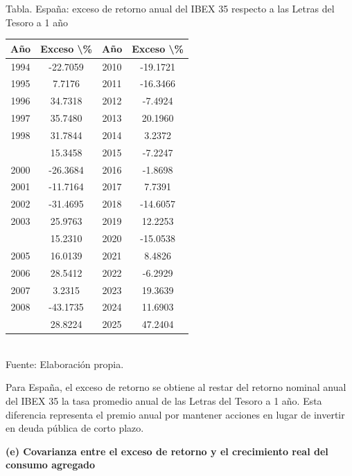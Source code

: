 \documentclass{article}\usepackage[]{graphicx}\usepackage[]{xcolor}
\begin{document}
\begin{center}
Tabla. España: exceso de retorno anual del IBEX 35 respecto a las Letras del Tesoro a 1 año
\end{center}
\begin{center}

\begin{tabular}{cccc}
\toprule
Año & Exceso \textbackslash{}\% & Año & Exceso \textbackslash{}\%\\
\midrule
1994 & -22.7059 & 2010 & -19.1721\\
1995 & 7.7176 & 2011 & -16.3466\\
1996 & 34.7318 & 2012 & -7.4924\\
1997 & 35.7480 & 2013 & 20.1960\\
1998 & 31.7844 & 2014 & 3.2372\\
\addlinespace
1999 & 15.3458 & 2015 & -7.2247\\
2000 & -26.3684 & 2016 & -1.8698\\
2001 & -11.7164 & 2017 & 7.7391\\
2002 & -31.4695 & 2018 & -14.6057\\
2003 & 25.9763 & 2019 & 12.2253\\
\addlinespace
2004 & 15.2310 & 2020 & -15.0538\\
2005 & 16.0139 & 2021 & 8.4826\\
2006 & 28.5412 & 2022 & -6.2929\\
2007 & 3.2315 & 2023 & 19.3639\\
2008 & -43.1735 & 2024 & 11.6903\\
\addlinespace
2009 & 28.8224 & 2025 & 47.2404\\
\bottomrule
\end{tabular}
\\[0.3em]
{\footnotesize Fuente: Elaboración propia.}
\end{center}


Para España, el exceso de retorno se obtiene al restar del retorno nominal anual del IBEX 35 la tasa promedio anual de las Letras del Tesoro a 1 año. Esta diferencia representa el premio anual por mantener acciones en lugar de invertir en deuda pública de corto plazo.

\newpage
\textbf{(e) Covarianza entre el exceso de retorno y el crecimiento real del consumo agregado}
\end{document}
